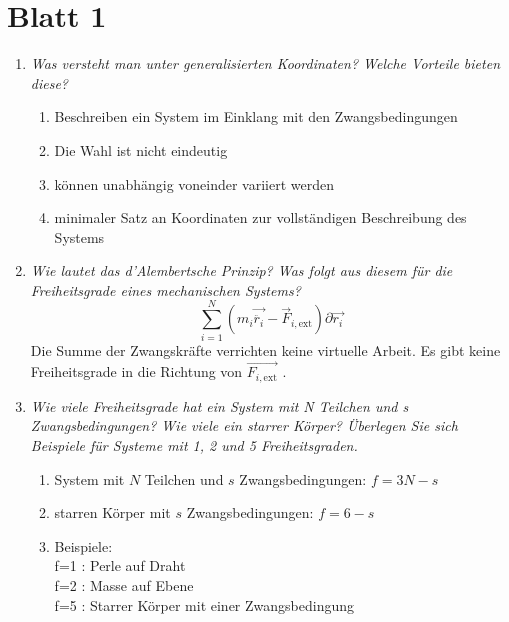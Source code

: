 \section*{Blatt 1}
\begin{enumerate}
    \item \textit{Was versteht man unter generalisierten Koordinaten? Welche Vorteile bieten diese?}
        \begin{enumerate}
            \item Beschreiben ein System im Einklang mit den Zwangsbedingungen
            \item Die Wahl ist nicht eindeutig
            \item können unabhängig voneinder variiert werden
            \item minimaler Satz an Koordinaten zur vollständigen Beschreibung des Systems
        \end{enumerate}
    \item \textit{Wie lautet das d'Alembertsche Prinzip? Was folgt aus diesem für die Freiheitsgrade eines mechanischen Systems?}\\
        \begin{equation}
            \sum_{i=1}^N (m_i \vec{\ddot{r_i}} - \vec{F}_{i,\text{ext}}) \partial \vec{r_i}
        \end{equation}
        Die Summe der Zwangskräfte verrichten keine virtuelle Arbeit. Es gibt keine Freiheitsgrade in die Richtung von $\vec{F_{i,\text{ext}}}$ .
    \item \textit{Wie viele Freiheitsgrade hat ein System mit N Teilchen und s Zwangsbedingungen? Wie viele ein starrer Körper? Überlegen Sie sich Beispiele für Systeme mit 1, 2 und 5 Freiheitsgraden.}
        \begin{enumerate}
            \item System mit $N$ Teilchen und $s$ Zwangsbedingungen: $f=3N-s$
            \item starren Körper mit $s$ Zwangsbedingungen: $f=6-s$
            \item Beispiele: \\ f=1 : Perle auf Draht \\ f=2 : Masse auf Ebene \\ f=5 : Starrer Körper mit einer Zwangsbedingung
        \end{enumerate}
\end{enumerate}

\newpage

